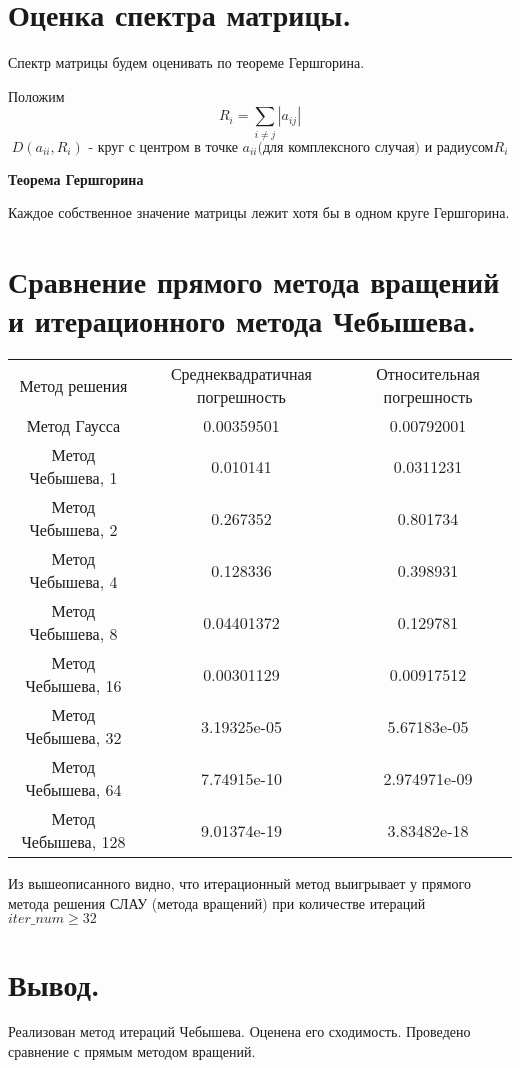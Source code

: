 \documentclass[a4paper,12pt]{article}
\begin{document}
\section*{Оценка спектра матрицы.}
Спектр матрицы будем оценивать по теореме Гершгорина.

Положим  
$$R_i = \sum_{i \ne j} |a_{ij}|$$
$$D(a_{ii}, R_i) \text{ - круг с центром в точке } a_{ii} \text{(для комплексного случая) и радиусом} R_i$$

\textbf{Теорема Гершгорина}

Каждое собственное значение матрицы лежит хотя бы в одном круге Гершгорина.

\section*{Сравнение прямого метода вращений и итерационного метода Чебышева.}

\begin{center}
    \begin{tabular}{ c c c }
     Метод решения & Среднеквадратичная погрешность & Относительная погрешность \\ 
     Метод Гаусса & 0.00359501 & 0.00792001 \\
     Метод Чебышева, 1 & 0.010141 & 0.0311231 \\
     Метод Чебышева, 2 & 0.267352 & 0.801734 \\
     Метод Чебышева, 4 & 0.128336 & 0.398931 \\
     Метод Чебышева, 8 & 0.04401372 & 0.129781 \\
     Метод Чебышева, 16 & 0.00301129 & 0.00917512 \\
     Метод Чебышева, 32 & 3.19325e-05 & 5.67183e-05 \\
     Метод Чебышева, 64 & 7.74915e-10 & 2.974971e-09 \\
     Метод Чебышева, 128 & 9.01374e-19 & 3.83482e-18 \\
    \end{tabular}
\end{center}


Из вышеописанного видно, что итерационный метод выигрывает у прямого метода решения СЛАУ (метода вращений) при количестве итераций $iter\_num \ge 32$

\section*{Вывод.}
Реализован метод итераций Чебышева. Оценена его сходимость. Проведено сравнение с прямым методом вращений.  
\end{document}
